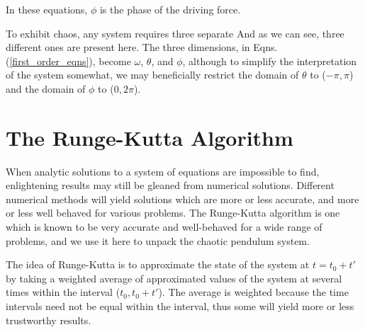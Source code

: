 \documentclass[aps,pre,nofootinbib]{revtex4}
\begin{document}
In these equations, $\phi$ is the phase of the driving force.  

To exhibit chaos, any system requires three separate 
And as we can see, three different ones are present here.  The three dimensions, in Eqns. (\ref{first_order_eqns}), become $\omega$, $\theta$, and $\phi$, although to simplify the interpretation of the system somewhat, we may beneficially restrict the domain of $\theta$ to ($-\pi, \pi$) and the domain of $\phi$ to ($0, 2\pi$).  



\section{The Runge-Kutta Algorithm}

When analytic solutions to a system of equations are impossible to find, enlightening results may still be gleaned from numerical solutions.  Different numerical methods will yield solutions which are more or less accurate, and more or less well behaved for various problems.  The Runge-Kutta algorithm is one which is known to be very accurate and well-behaved for a wide range of problems, and we use it here to unpack the chaotic pendulum system.  

The idea of Runge-Kutta is to approximate the state of the system at $t = t_0+t'$ by taking a weighted average of approximated values of the system at several times within the interval ($t_0, t_0+t'$).  
The average is weighted because the time intervals need not be equal within the interval, thus some will yield more or less trustworthy results.  
\end{document}
